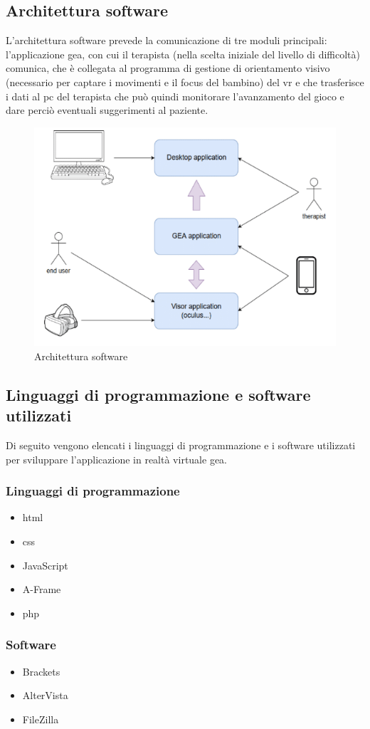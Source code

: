 \subsection{Architettura software} \label{subsec:soft}
L'architettura software prevede la comunicazione di tre moduli principali: l'applicazione \acs{gea}, con cui il terapista (nella scelta iniziale del livello di difficoltà) comunica, che è collegata al programma di gestione di orientamento visivo (necessario per captare i movimenti e il focus del bambino) del \acs{vr} e che trasferisce i dati al \acs{pc} del terapista che può quindi monitorare l'avanzamento del gioco e dare perciò eventuali suggerimenti al paziente.
\vspace{70pt}
\begin{figure}[htbp]
\centering
\includegraphics[width=\textwidth]{Images/software}
\caption{Architettura software}
\label{fig:software}
\end{figure}
\clearpage

\subsection{Linguaggi di programmazione e software utilizzati} \label{subsec:ling}
Di seguito vengono elencati i linguaggi di programmazione e i software utilizzati per sviluppare l'applicazione in realtà virtuale \acs{gea}.
\subsubsection{Linguaggi di programmazione}
\begin{itemize}
	\item \acs{html}
	\item \acs{css}
	\item JavaScript
	\item A-Frame
	\item \acs{php}
\end{itemize}
\subsubsection{Software}
\begin{itemize}
	\item Brackets
	\item AlterVista
	\item FileZilla
\end{itemize}